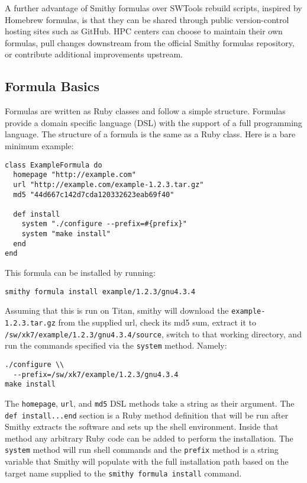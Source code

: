 \documentclass{acm_proc_article-sp}
\begin{document}
A further advantage of Smithy formulas over SWTools rebuild scripts, inspired by
Homebrew formulas, is that they can be shared through public version-control
hosting sites such as GitHub. HPC centers can choose to maintain their own
formulas, pull changes downstream from the official Smithy formulas repository,
or contribute additional improvements upstream.

\subsection{Formula Basics}

Formulas are written as Ruby classes and follow a simple structure.  Formulas
provide a domain specific language (DSL) with the support of a full programming
language. The structure of a formula is the same as a Ruby class. Here is a bare
minimum example:

\begin{quoting}
\begin{verbatim}
class ExampleFormula do
  homepage "http://example.com"
  url "http://example.com/example-1.2.3.tar.gz"
  md5 "44d667c142d7cda120332623eab69f40"

  def install
    system "./configure --prefix=#{prefix}"
    system "make install"
  end
end
\end{verbatim}
\end{quoting}

This formula can be installed by running:

\begin{quoting}
\begin{verbatim}
smithy formula install example/1.2.3/gnu4.3.4
\end{verbatim}
\end{quoting}

Assuming that this is run on Titan, smithy will download the
\texttt{example-1.2.3.tar.gz} from the supplied url, check its md5 sum, extract
it to \texttt{/sw/xk7/example/1.2.3/gnu4.3.4/source}, switch to that working
directory, and run the commands specified via the \texttt{system} method.
Namely:

\begin{quoting}
\begin{verbatim}
./configure \\
  --prefix=/sw/xk7/example/1.2.3/gnu4.3.4
make install
\end{verbatim}
\end{quoting}

The \texttt{homepage}, \texttt{url}, and \texttt{md5} DSL methods take a string
as their argument. The \texttt{def install...end} section is a Ruby method
definition that will be run after Smithy extracts the software and sets up the
shell environment. Inside that method any arbitrary Ruby code can be added to
perform the installation. The \texttt{system} method will run shell commands and
the \texttt{prefix} method is a string variable that Smithy will populate with
the full installation path based on the target name supplied to the
\texttt{smithy formula install} command.
\end{document}
